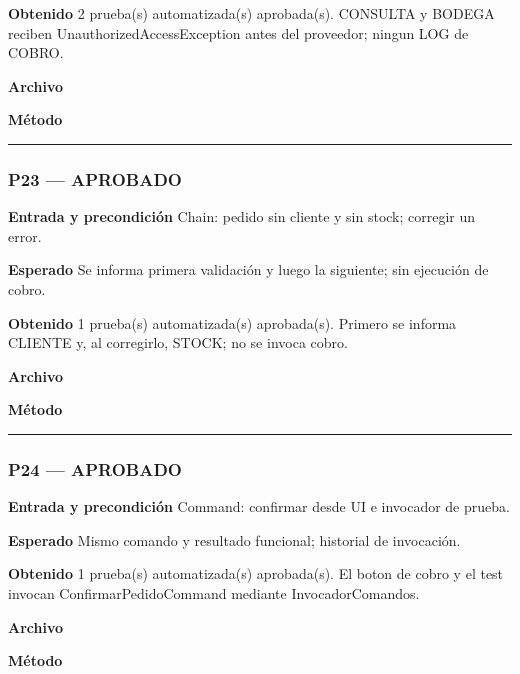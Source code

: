 \textbf{Obtenido} 2 prueba(s) automatizada(s) aprobada(s). CONSULTA y BODEGA reciben UnauthorizedAccessException antes del proveedor; ningun LOG de COBRO.

\textbf{Archivo} \href{https://github.com/Alan77-bot/LogiMarket360Alan/blob/68bda51063441415524ede51bdf61649ee9b4973/tests/LogiMarket.Tests/Aplicacion/PermisosTests.cs}{}

\textbf{Método} 

\medskip\hrule\medskip
\subsubsection*{P23 --- APROBADO}
\textbf{Entrada y precondición} Chain: pedido sin cliente y sin stock; corregir un error.

\textbf{Esperado} Se informa primera validación y luego la siguiente; sin ejecución de cobro.

\textbf{Obtenido} 1 prueba(s) automatizada(s) aprobada(s). Primero se informa CLIENTE y, al corregirlo, STOCK; no se invoca cobro.

\textbf{Archivo} \href{https://github.com/Alan77-bot/LogiMarket360Alan/blob/68bda51063441415524ede51bdf61649ee9b4973/tests/LogiMarket.Tests/Patrones/ComportamentalesTests.cs}{}

\textbf{Método} 

\medskip\hrule\medskip
\subsubsection*{P24 --- APROBADO}
\textbf{Entrada y precondición} Command: confirmar desde UI e invocador de prueba.

\textbf{Esperado} Mismo comando y resultado funcional; historial de invocación.

\textbf{Obtenido} 1 prueba(s) automatizada(s) aprobada(s). El boton de cobro y el test invocan ConfirmarPedidoCommand mediante InvocadorComandos.

\textbf{Archivo} \href{https://github.com/Alan77-bot/LogiMarket360Alan/blob/68bda51063441415524ede51bdf61649ee9b4973/tests/LogiMarket.Tests/Aplicacion/ComandosTests.cs}{}

\textbf{Método} 

